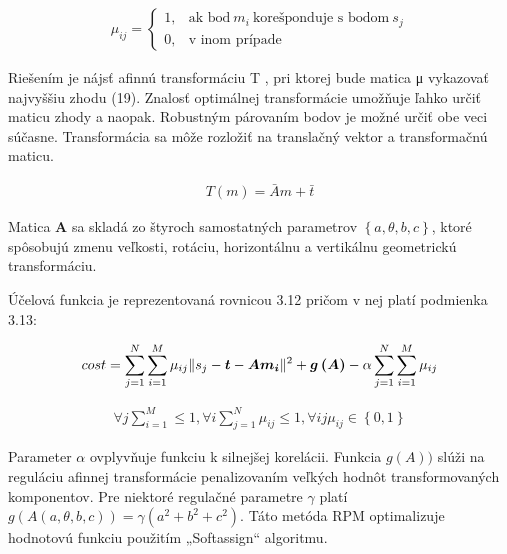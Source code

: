 \begin{equation}
\label{eq10}
\begin{aligned}
\mu_{ij}=
\begin{cases}
1, & \text{ak bod}\ m_i\ \text{korešponduje s bodom}\ s_j \\
0, & \text{v inom prípade}
\end{cases}
\end{aligned}
\end{equation}

Riešením je nájsť afinnú transformáciu T , pri ktorej bude matica μ vykazovať najvyššiu zhodu (19). Znalosť optimálnej transformácie umožňuje ľahko určiť maticu zhody a naopak. Robustným párovaním bodov je možné určiť obe veci súčasne. Transformácia sa môže rozložiť na translačný vektor a transformačnú maticu.

\begin{equation}
\label{eq11}
\begin{aligned}
T\left(m\right)=\bar{A}m+\bar{t}
\end{aligned}
\end{equation}

Matica \textbf{A} sa skladá zo štyroch samostatných parametrov $\left\lbrace a, \theta, b, c \right\rbrace$, ktoré spôsobujú zmenu veľkosti, rotáciu, horizontálnu a vertikálnu geometrickú transformáciu.

Účelová funkcia je reprezentovaná rovnicou 3.12 pričom v nej platí podmienka 3.13:

\begin{equation}
\label{eq12}
\begin{aligned}
cost=\sum_{j=1}^{N}\sum_{i=1}^{M} \mu_{ij} \Arrowvert s_j - \boldsymbol{t} - \boldsymbol{Am_i} \Arrowvert^2 + \boldsymbol{g\left(A\right)} -\alpha \sum_{j=1}^{N}\sum_{i=1}^{M} \mu_{ij}
\end{aligned}
\end{equation}

\begin{equation}
\label{eq13}
\begin{aligned}
\forall j \sum_{i=1}^{M} \leq 1, \forall i \sum_{j=1}^{N} \mu_{ij} \leq 1, \forall ij \mu_{ij} \in \left\lbrace 0,1 \right\rbrace 
\end{aligned}
\end{equation}

Parameter $\alpha$ ovplyvňuje funkciu k silnejšej korelácii. Funkcia $g\left(A\right))$ slúži na reguláciu afinnej transformácie penalizovaním veľkých hodnôt transformovaných komponentov. Pre niektoré regulačné parametre $\gamma$ platí $g\left(A\left(a, \theta, b, c\right)\right) = \gamma \left(a^2 + b^2 + c^2 \right)$. Táto metóda RPM optimalizuje hodnotovú funkciu použitím „Softassign“ algoritmu.

